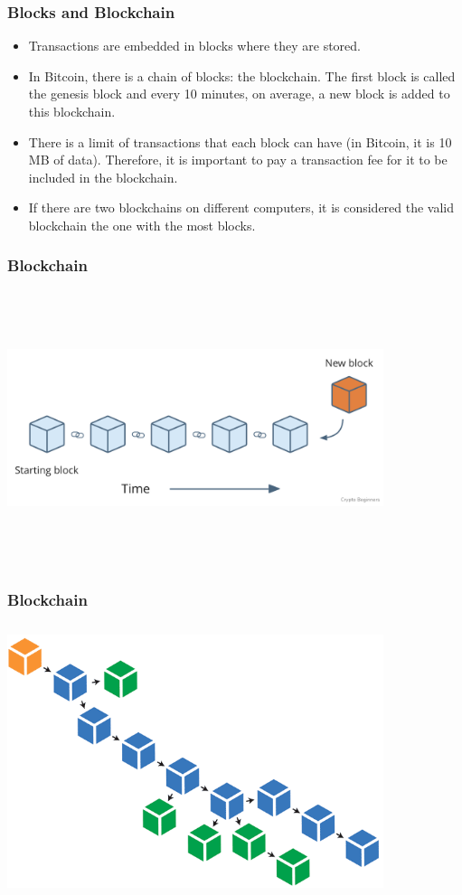 \documentclass{beamer}
\begin{document}
\begin{frame}
   \frametitle{Blocks and Blockchain}
   \begin{itemize}[<+->]
     \item Transactions are embedded in blocks where they are stored.
     \item In Bitcoin, there is a chain of blocks: the blockchain.
       The first block is called the genesis block and every 10 minutes, on average, a new block is added to this blockchain.
     \item There is a limit of transactions that each block can have (in Bitcoin, it is 10 MB of data).
       Therefore, it is important to pay a transaction fee for it to be included in the blockchain.
     \item If there are two blockchains on different computers, it is considered the valid blockchain the one with the most blocks.
   \end{itemize}
\end{frame}

\begin{frame}
\frametitle{Blockchain}
\includegraphics[width=11cm, height=8cm]{blockchain1}
\end{frame}

\begin{frame}
\frametitle{Blockchain}
\includegraphics[width=11cm, height=8cm]{blockchain2}
\end{frame}
\end{document}
